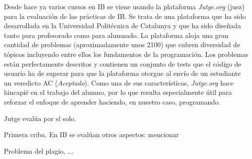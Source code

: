 \documentclass[twocolumn,twoside,a4paper, 10pt]{article}
\newcommand{\jutge}{\textit{Jutge.org}{}}           %
\begin{document}
% 

Desde hace ya varios cursos en IB se viene usando la plataforma \jutge{} (juez) 
\cite{URL::Jutge, Petit:Jutge:2018} para la evaluación de las prácticas de IB.
Se trata de una plataforma que ha sido desarrollada en la Universidad Politécnica de Catalunya y que ha sido
diseñada tanto para profesorado como para alumnado.
La plataforma aloja una gran cantidad de problemas (aproximadamente unos 2100) que cubren diversidad de
tópicos incluyendo entre ellos los fundamentos de la programación.
Los problemas están perfectamente descritos y contienen un conjunto de tests que el código de usuario ha de
superar para que la plataforma otorgue al envío de un estudiante un veredicto AC (\textit{Aceptado}).
Como una de sus características, \jutge{} hace hincapié en el trabajo del alumno, por lo que 
resulta especialmente útil para reforzar el enfoque de aprender haciendo, en nuestro caso, programando.

Jutge evalúa por sí solo.

Primera criba. En IB se evalúan otros aspectos: mencionar

Problema del plagio, ...



\end{document}
